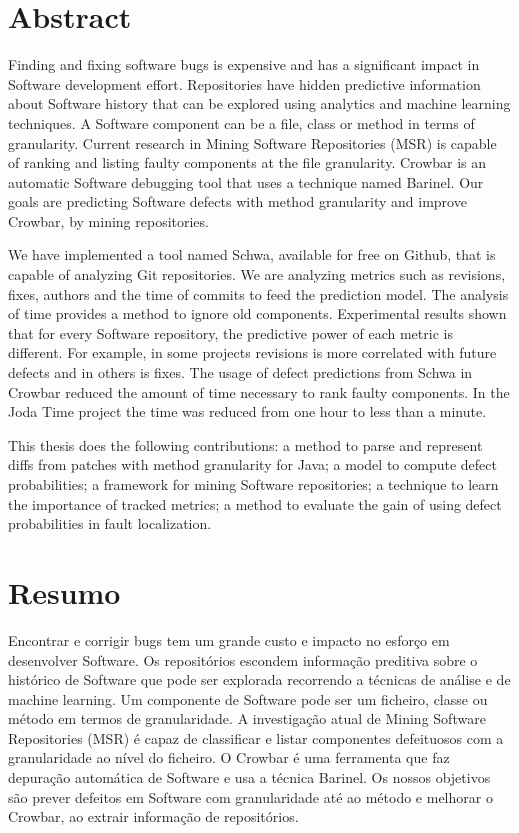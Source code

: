 \chapter*{Abstract}
Finding and fixing software bugs is expensive and has a significant impact in Software development effort. Repositories have hidden predictive information about Software history that can be explored using analytics and machine learning techniques. A Software component can be a file, class or method in terms of granularity. Current research in Mining Software Repositories (MSR) is capable of ranking and listing faulty components at the file granularity. Crowbar is an automatic Software debugging tool that uses a technique named Barinel. Our goals are predicting Software defects with method granularity and improve Crowbar, by mining repositories. 

We have implemented a tool named Schwa, available for free on Github, that is capable of analyzing Git repositories. We are analyzing metrics such as revisions, fixes, authors and the time of commits to feed the prediction model. The analysis of time provides a method to ignore old components. Experimental results shown that for every Software repository, the predictive power of each metric is different. For example, in some projects revisions is more correlated with future defects and in others is fixes. The usage of defect predictions from Schwa in Crowbar reduced the amount of time necessary to rank faulty components. In the Joda Time project the time was reduced from one hour to less than a minute.

This thesis does the following contributions: a method to parse and represent diffs from patches with method granularity for Java; a model to compute defect probabilities; a framework for mining Software repositories; a technique to learn the importance of tracked metrics; a method to evaluate the gain of using defect probabilities in fault localization. 

\chapter*{Resumo}
Encontrar e corrigir bugs tem um grande custo e impacto no esforço em desenvolver Software. Os repositórios escondem informação preditiva sobre o histórico de Software que pode ser explorada recorrendo a técnicas de análise e de machine learning. Um componente de Software pode ser um ficheiro, classe ou método em termos de granularidade. A investigação atual de Mining Software Repositories (MSR) é capaz de classificar e listar componentes defeituosos com a granularidade ao nível do ficheiro. O Crowbar é uma ferramenta que faz depuração automática de Software e usa a técnica Barinel. Os nossos objetivos são prever defeitos em Software com granularidade até ao método e melhorar o Crowbar, ao extrair informação de repositórios.

